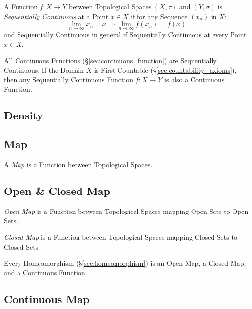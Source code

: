 A Function $f : X \rightarrow Y$ between Topological Spaces $(X,
\tau)$ and $(Y, \sigma)$ is \emph{Sequentially Continuous} at a Point
$x \in X$ if for any Sequence $(x_n)$ in $X$:
\[
  \lim_{n \rightarrow \infty} x_n = x
  \Rightarrow \lim_{n \rightarrow \infty} f(x_n) = f(x)
\]
and Sequentially Continuous in general if Sequentially Continuous at
every Point $x \in X$.

All Continuous Functions (\S\ref{sec:continuous_function}) are
Sequentially Continuous. If the Domain $X$ is First Countable
(\S\ref{sec:countability_axioms}), then any Sequentially Continuous
Function $f : X \rightarrow Y$ is also a Continuous Function.



\subsection{Density}\label{sec:density}

\subsection{Map}\label{sec:topology_map}

A \emph{Map} is a Function between Topological Spaces.



\subsection{Open \& Closed Map}\label{sec:open_closed_map}

\emph{Open Map} is a Function between Topological Spaces mapping Open
Sets to Open Sets.

\emph{Closed Map} is a Function between Topological Spaces mapping Closed
Sets to Closed Sets.

Every Homeomorphism (\S\ref{sec:homeomorphism}) is an Open Map, a
Closed Map, and a Continuous Function.



\subsection{Continuous Map}\label{sec:continuous_map}

